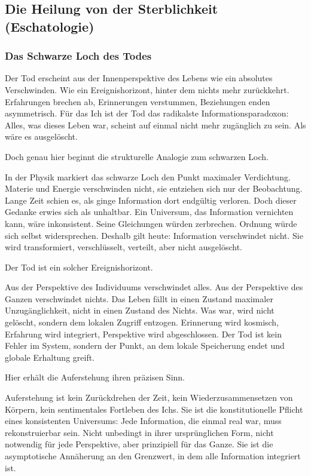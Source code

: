 \documentclass[
  ngerman,
]{article}
\begin{document}
\subsection{\texorpdfstring{\textbf{Die Heilung von der Sterblichkeit
(Eschatologie)}}{Die Heilung von der Sterblichkeit (Eschatologie)}}\label{die-heilung-von-der-sterblichkeit-eschatologie}

\subsubsection{\texorpdfstring{\textbf{Das Schwarze Loch des
Todes}}{Das Schwarze Loch des Todes}}\label{das-schwarze-loch-des-todes}

Der Tod erscheint aus der Innenperspektive des Lebens wie ein absolutes
Verschwinden. Wie ein Ereignishorizont, hinter dem nichts mehr
zurückkehrt. Erfahrungen brechen ab, Erinnerungen verstummen,
Beziehungen enden asymmetrisch. Für das Ich ist der Tod das radikalste
Informationsparadoxon: Alles, was dieses Leben war, scheint auf einmal
nicht mehr zugänglich zu sein. Als wäre es ausgelöscht.

Doch genau hier beginnt die strukturelle Analogie zum schwarzen Loch.

In der Physik markiert das schwarze Loch den Punkt maximaler
Verdichtung. Materie und Energie verschwinden nicht, sie entziehen sich
nur der Beobachtung. Lange Zeit schien es, als ginge Information dort
endgültig verloren. Doch dieser Gedanke erwies sich als unhaltbar. Ein
Universum, das Information vernichten kann, wäre inkonsistent. Seine
Gleichungen würden zerbrechen. Ordnung würde sich selbst widersprechen.
Deshalb gilt heute: Information verschwindet nicht. Sie wird
transformiert, verschlüsselt, verteilt, aber nicht ausgelöscht.

Der Tod ist ein solcher Ereignishorizont.

Aus der Perspektive des Individuums verschwindet alles. Aus der
Perspektive des Ganzen verschwindet nichts. Das Leben fällt in einen
Zustand maximaler Unzugänglichkeit, nicht in einen Zustand des Nichts.
Was war, wird nicht gelöscht, sondern dem lokalen Zugriff entzogen.
Erinnerung wird kosmisch, Erfahrung wird integriert, Perspektive wird
abgeschlossen. Der Tod ist kein Fehler im System, sondern der Punkt, an
dem lokale Speicherung endet und globale Erhaltung greift.

Hier erhält die Auferstehung ihren präzisen Sinn.

Auferstehung ist kein Zurückdrehen der Zeit, kein Wiederzusammensetzen
von Körpern, kein sentimentales Fortleben des Ichs. Sie ist die
konstitutionelle Pflicht eines konsistenten Universums: Jede
Information, die einmal real war, muss rekonstruierbar sein. Nicht
unbedingt in ihrer ursprünglichen Form, nicht notwendig für jede
Perspektive, aber prinzipiell für das Ganze. Sie ist die asymptotische
Annäherung an den Grenzwert, in dem alle Information integriert ist.
\end{document}
